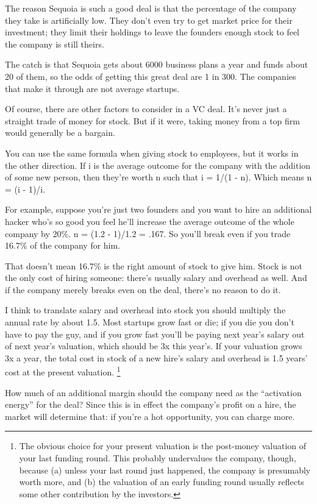 The reason Sequoia is such a good deal is that the percentage of the
company they take is artificially low. They don't even try to get market
price for their investment; they limit their holdings to leave the
founders enough stock to feel the company is still theirs.

The catch is that Sequoia gets about 6000 business plans a year and
funds about 20 of them, so the odds of getting this great deal are 1 in
300. The companies that make it through are not average startups.

Of course, there are other factors to consider in a VC deal. It's never
just a straight trade of money for stock. But if it were, taking money
from a top firm would generally be a bargain.

You can use the same formula when giving stock to employees, but it
works in the other direction. If i is the average outcome for the
company with the addition of some new person, then they're worth n such
that i = 1/(1 - n). Which means n = (i - 1)/i.

For example, suppose you're just two founders and you want to hire an
additional hacker who's so good you feel he'll increase the average
outcome of the whole company by 20\%. n = (1.2 - 1)/1.2 = .167. So
you'll break even if you trade 16.7\% of the company for him.

That doesn't mean 16.7\% is the right amount of stock to give him. Stock
is not the only cost of hiring someone: there's usually salary and
overhead as well. And if the company merely breaks even on the deal,
there's no reason to do it.

I think to translate salary and overhead into stock you should multiply
the annual rate by about 1.5. Most startups grow fast or die; if you die
you don't have to pay the guy, and if you grow fast you'll be paying
next year's salary out of next year's valuation, which should be 3x this
year's. If your valuation grows 3x a year, the total cost in stock of a
new hire's salary and overhead is 1.5 years' cost at the present
valuation. \footnote{The obvious choice for your present valuation is the post-money
valuation of your last funding round. This probably undervalues the
company, though, because (a) unless your last round just happened, the
company is presumably worth more, and (b) the valuation of an early
funding round usually reflects some other contribution by the investors.}

How much of an additional margin should the company need as the
``activation energy'' for the deal? Since this is in effect the
company's profit on a hire, the market will determine that: if you're a
hot opportunity, you can charge more.

